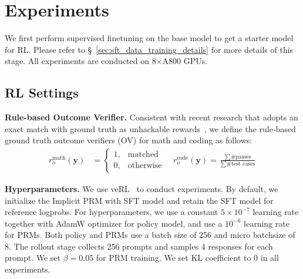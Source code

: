 \section{Experiments}
\label{sec:exp}
We first perform supervised finetuning on the base model to get a starter model for RL. Please refer to \S~\ref{sec:sft_data_training_details} for more details of this stage. All experiments are conducted on 8$\times$A800 GPUs.


\subsection{RL Settings}
\textbf{Rule-based Outcome Verifier.}
Consistent with recent research that adopts an exact match with ground truth as unhackable rewards~\citep{Gao2024OnDE, Lambert2024TLU3P,deepseekai2025deepseekr1incentivizingreasoningcapability}, we define the rule-based ground truth outcome verifiers (OV) for math and coding as follows: 
\begin{align*}
r_o^{\text{math}}(\mathbf{y}) &= \begin{cases}1, &\text{matched} \\ 0,&\text{otherwise} \end{cases} \quad
r_o^{\text{code}}(\mathbf{y}) =\frac{\sum \text{\#passes}}{\sum \text{\#test cases}}
\end{align*}



\textbf{Hyperparameters.}
We use veRL~\citep{sheng2024hybridflow} to conduct experiments.
By default, we initialize the Implicit PRM with SFT model and retain the SFT model for reference logprobs. For hyperparameters, we use a constant $5\times 10^{-7}$ learning rate together with AdamW optimizer for policy model, and use a $10^{-6}$ learning rate for PRMs. Both policy and PRMs use a batch size of 256 and micro batchsize of 8. The rollout stage collects 256 prompts and samples 4 responses for each prompt. We set $\beta=0.05$ for PRM training. We set KL coefficient to 0 in all experiments.

